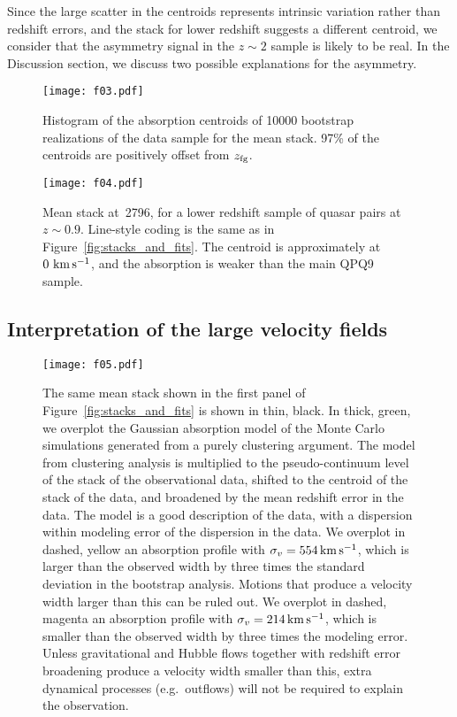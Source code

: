 \documentclass[iop]{emulateapj}
\begin{document}
Since the large scatter in the centroids represents intrinsic variation rather than redshift
errors, and the  stack for lower redshift suggests a different centroid, we
consider that the asymmetry signal in the $z\sim2$ sample is likely to be real. In the Discussion
section, we discuss two possible explanations for the asymmetry.

\begin{figure}
\texttt{[image: f03.pdf]}
\caption{Histogram of the absorption centroids of 10000 bootstrap realizations of the data sample
for the  mean stack. 97\% of the centroids are positively offset from $z_{\rm fg}$.}
\label{fig:histogram_cen}
\end{figure}

\begin{figure}
\texttt{[image: f04.pdf]}
\caption{Mean stack at \,2796, for a lower redshift sample of quasar pairs at
$z\sim0.9$. Line-style coding is the same as in Figure~\ref{fig:stacks_and_fits}. The centroid is
approximately at $0\,{\rm \,km\,s^{-1}}$, and the absorption is weaker than the main QPQ9 sample.
}
\label{fig:stack_z1}
\end{figure}


\subsection{Interpretation of the large velocity fields}
\label{sec:significance_width}

\begin{figure}
\texttt{[image: f05.pdf]}
\caption{The same  mean stack shown in the first panel of
Figure~\ref{fig:stacks_and_fits} is shown in thin, black. In thick, green, we overplot the
Gaussian absorption model of the Monte Carlo simulations generated from a purely clustering
argument. The model from clustering analysis is multiplied to the pseudo-continuum level of the
stack of the observational data, shifted to the centroid of the stack of the data, and broadened
by the mean redshift error in the data. The model is a good description of the data, with a
dispersion within modeling error of the dispersion in the data. We overplot in dashed, yellow an
absorption profile with $\sigma_v=554\,{\rm km\,s^{-1}}$, which is larger than the observed width
by three times the standard deviation in the bootstrap analysis. Motions that produce a velocity
width larger than this can be ruled out. We overplot in dashed, magenta an absorption profile with
$\sigma_v=214\,{\rm km\,s^{-1}}$, which is smaller than the observed width by three times the
modeling error. Unless gravitational and Hubble flows together with redshift error broadening
produce a velocity width smaller than this, extra dynamical processes (e.g.\ outflows) will not be
required to explain the observation.
}
\label{fig:monte}
\end{figure}
\end{document}
